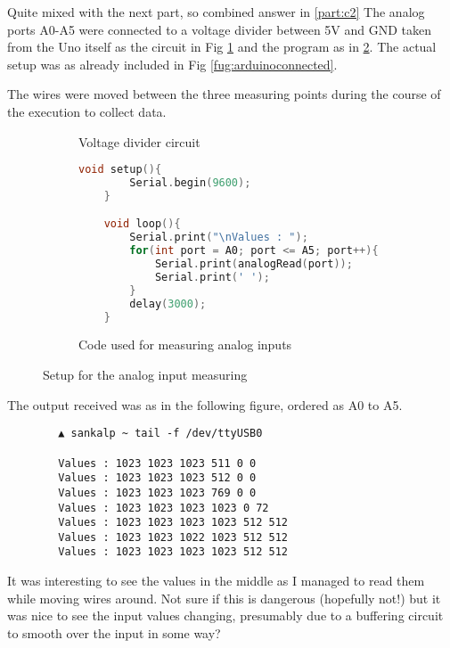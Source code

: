 \newpage


\begin{arabicparts}
    
    \questionpart
    Quite mixed with the next part, so combined answer in \ref{part:c2}
    \questionpart
    \label{part:c2}
    The analog ports A0-A5 were connected to a voltage divider between
    5V and GND taken from the Uno itself as the circuit in Fig \ref{subfig:voltdiv}
    and the program as in \ref{subfig:analogcode}. The actual setup was as already
    included in Fig \ref{fug:arduinoconnected}.

    The wires were moved between the three measuring points during the course 
    of the execution to collect data.

    \begin{figure}[ht]
        \centering
        \begin{subfigure}[b]{0.7\textwidth}
            \def\svgwidth{0.5\textwidth}
            \scalebox{1.1}{}
            \caption{Voltage divider circuit}
            \label{subfig:voltdiv}
        \end{subfigure}
        \begin{subfigure}[b]{0.7\textwidth}
            \begin{lstlisting}[language=C++]
    void setup(){
        Serial.begin(9600);
    }

    void loop(){
        Serial.print("\nValues : ");
        for(int port = A0; port <= A5; port++){
            Serial.print(analogRead(port));
            Serial.print(' ');
        }
        delay(3000);
    }
            \end{lstlisting}
            \caption{Code used for measuring analog inputs}
            \label{subfig:analogcode}
        \end{subfigure}
        \caption{Setup for the analog input measuring}
        \label{fig:analogsetup}
    \end{figure}

    The output received was as in the following figure, ordered as A0 to A5.

    \begin{verbatim}
        ▲ sankalp ~ tail -f /dev/ttyUSB0

        Values : 1023 1023 1023 511 0 0 
        Values : 1023 1023 1023 512 0 0 
        Values : 1023 1023 1023 769 0 0 
        Values : 1023 1023 1023 1023 0 72 
        Values : 1023 1023 1023 1023 512 512 
        Values : 1023 1023 1022 1023 512 512 
        Values : 1023 1023 1023 1023 512 512       
    \end{verbatim}

    It was interesting to see the values in the middle as I managed to read them
    while moving wires around. Not sure if this is dangerous (hopefully not!) but
    it was nice to see the input values changing, presumably due to a buffering
    circuit to smooth over the input in some way?
    
\end{arabicparts}

